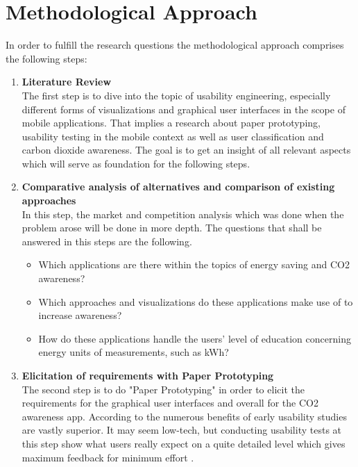 \section{Methodological Approach}

In order to fulfill the research questions the methodological approach comprises the following steps:
\begin{enumerate}
	\item \textbf{Literature Review} \\
	The first step is to dive into the topic of usability engineering, especially different forms of visualizations and graphical user interfaces in the scope of mobile applications. That implies a research about paper prototyping, usability testing in the mobile context as well as user classification and carbon dioxide awareness. The goal is to get an insight of all relevant aspects which will serve as foundation for the following steps.
	
	\item \textbf{Comparative analysis of alternatives and comparison of existing approaches} \\
	In this step, the market and competition analysis which was done when the problem arose will be done in more depth. The questions that shall be answered in this steps are the following.
	\begin{itemize}
		\item Which applications are there within the topics of energy saving and CO2 awareness?
		\item Which approaches and visualizations do these applications make use of to increase awareness?
		\item How do these applications handle the users' level of education concerning energy units of measurements, such as kWh?
	\end{itemize}
	
	\item \textbf{Elicitation of requirements with Paper Prototyping} \\
	The second step is to do "Paper Prototyping" in order to elicit the requirements for the graphical user interfaces and overall for the CO2 awareness app. According to \cite{lancaster2004paper} the numerous benefits of early usability studies are vastly superior. It may seem low-tech, but conducting usability tests at this step show what users really expect on a quite detailed level which gives maximum feedback for minimum effort \cite{weiss2003handheld}.
	

\end{enumerate}
